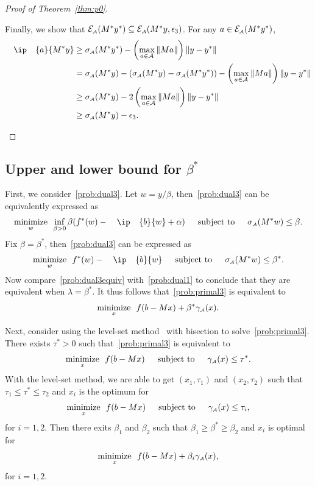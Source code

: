 \begin{proof}[Proof of Theorem~\ref{thm:p0}]
\begin{itemize}
      Finally, we show that $\mathcal{E}_{\scriptscriptstyle\mathcal{A}}(M^*y^*) \subseteq \mathcal{E}_{\scriptscriptstyle\mathcal{A}}(M^*y, \epsilon_3)$. For any $a \in \mathcal{E}_{\scriptscriptstyle\mathcal{A}}(M^*y^*)$, 
      \begin{align*}
        \ip{a}{M^*y} &\geq \sigma\As(M^*y^*) - \left(\max\limits_{a \in \Ascr}\|Ma\|\right)\|y - y^*\|
        \\&= \sigma\As(M^*y) - \left(\sigma\As(M^*y) - \sigma\As(M^*y^*)\right) - \left(\max\limits_{a \in \Ascr}\|Ma\|\right)\|y - y^*\|
        \\&\geq \sigma\As(M^*y) - 2\left(\max\limits_{a \in \Ascr}\|Ma\|\right)\|y - y^*\|
        \\&\geq \sigma\As(M^*y) - \epsilon_3.
      \end{align*}
    \end{itemize}
\end{proof}


\subsection{Upper and lower bound for $\beta^*$}
\label{app:bounds}
First, we consider~\eqref{prob:dual3}. Let $w = y/\beta$, then~\eqref{prob:dual3} can be equivalently expressed as 
\[\minimize{w} \inf_{\beta>0} \beta(f^*(w) - \ip{b}{w} + \alpha) \enspace\text{subject to}\enspace \sigma\As(M^* w) \leq \beta.\]
Fix $\beta = \beta^*$, then~\eqref{prob:dual3} can be expressed as 
\begin{equation} \label{prob:dual3equiv}
  \minimize{w} f^*(w) - \ip{b}{w} \enspace\text{subject to}\enspace \sigma\As(M^* w) \leq \beta^*.
\end{equation}
Now compare~\eqref{prob:dual3equiv} with~\eqref{prob:dual1} to conclude that they are equivalent when $\lambda = \beta^*$. It thus follows that~\eqref{prob:primal3} is equivalent to  
\begin{equation} \label{prob:p1beta}
    \displaystyle\mathop{\hbox{\rm minimize}}_{x}\enspace f(b - Mx) + \beta^*\gamma_{\scriptscriptstyle\mathcal{A}}(x). 
\end{equation}   

Next, consider using the level-set method~\cite{aravkin2016levelset} with bisection to solve~\eqref{prob:primal3}. There exists $\tau^* > 0$ such that~\eqref{prob:primal3} is equivalent to
\begin{equation} \label{prob:p2tau}
    \displaystyle\mathop{\hbox{\rm minimize}}_{x}\enspace f(b - Mx) \enspace\hbox{\quad subject to\quad}\enspace \gamma_{\scriptscriptstyle\mathcal{A}}(x)\leq\tau^*. 
\end{equation}
With the level-set method, we are able to get $(x_1, \tau_1)$ and $(x_2, \tau_2)$ such that $\tau_1 \leq \tau^* \leq \tau_2$ and $x_i$ is the optimum for 
\begin{equation} \label{prob:p2taui}
    \displaystyle\mathop{\hbox{\rm minimize}}_{x}\enspace f(b - Mx) \enspace\hbox{\quad subject to\quad}\enspace \gamma_{\scriptscriptstyle\mathcal{A}}(x)\leq\tau_i, 
\end{equation}
for $i = 1, 2$. Then there exits $\beta_1$ and $\beta_2$ such that $\beta_1 \geq \beta^* \geq \beta_2$ and $x_i$ is optimal for 
\begin{equation} \label{prob:p1betai}
    \displaystyle\mathop{\hbox{\rm minimize}}_{x}\enspace f(b - Mx) + \beta_i\gamma_{\scriptscriptstyle\mathcal{A}}(x),
\end{equation}
for $i = 1, 2$.

